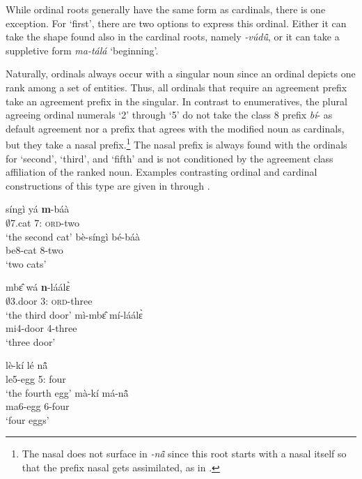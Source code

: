 While ordinal roots generally have the same form as cardinals, there is one exception. For `first', there are two options to express this ordinal. Either it can take the shape found also in the cardinal roots, namely {\itshape -vúdũ̂}, or it can take a suppletive form {\itshape ma-tálá} `beginning'. 

Naturally, ordinals always occur with a singular noun since an ordinal depicts one rank among a set of entities. Thus, all ordinals that require an agreement prefix take an agreement prefix in the singular. In contrast to enumeratives, the plural agreeing ordinal numerals `2' through `5' do not take the class 8 prefix {\itshape bí}- as default agreement nor a prefix that agrees with the modified noun as cardinals, but they take a nasal prefix.\footnote{The nasal does not surface in {\itshape -nã̂} since this root starts with a nasal itself so that the prefix nasal gets assimilated, as in .} The nasal prefix is always found with the ordinals for `second', `third', and `fifth' and is not conditioned by the agreement class affiliation of the ranked noun. Examples contrasting ordinal and cardinal constructions of this type are given in   through . 

\ea\label{Ordtwo}
\ea \label{Ordtwo1}
  \gll   síngì yá {\bfseries m}-báà \\
$\emptyset$7.cat 7:{\ATT} \textsc{ord}-two \\
    \trans `the second cat'
\ex \label{Ordtwo2}
  \gll   bè-síngì bé-báà \\
 be8-cat 8-two \\
    \trans `two cats'
\z    
\z

\ea\label{Ordthree}
\ea\label{Ordthree1}
\gll  mbɛ̂ wá {\bfseries n}-láálɛ̀ \\
$\emptyset$3.door 3:{\ATT} \textsc{ord}-three \\
  \trans `the third door'
 \ex\label{Ordthree2}
\gll  mì-mbɛ̂ mí-láálɛ̀ \\
  mi4-door 4-three \\
  \trans `three door'
\z  
\z  

\ea\label{Ordfour}
\ea\label{Ordfour1}
 \gll  lè-kí lé nã̂ \\
    le5-egg 5:{\ATT} four \\
    \trans `the fourth egg'
\ex\label{Ordfour2}
 \gll mà-kí má-nã̂ \\
    ma6-egg 6-four \\
    \trans `four eggs'
\z    
\z

